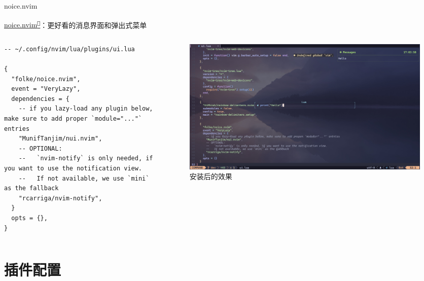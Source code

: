 \documentclass[aspectratio=169]{ctexbeamer}
\newcommand{\nerd}[1]{\texttt{#1}}
\newcommand{\link}[3][]{\href{#3}{#2\textsuperscript{\nerd{}}}}
\begin{document}
    \begin{frame}[fragile]{noice.nvim}

      \link{noice.nvim}{https://github.com/folke/noice.nvim}：更好看的消息界面和弹出式菜单 %

      \begin{columns}
        \begin{column}{0.4\linewidth}
          \begin{lstlisting}[basicstyle=\tiny\ttfamily]
-- ~/.config/nvim/lua/plugins/ui.lua

{
  "folke/noice.nvim",
  event = "VeryLazy",
  dependencies = {
    -- if you lazy-load any plugin below, make sure to add proper `module="..."` entries
    "MunifTanjim/nui.nvim",
    -- OPTIONAL:
    --   `nvim-notify` is only needed, if you want to use the notification view.
    --   If not available, we use `mini` as the fallback
    "rcarriga/nvim-notify",
  }
  opts = {},
}
          \end{lstlisting}
        \end{column}

        \begin{column}{0.6\linewidth}

          \begin{figure}[H]
            \centering
            \includegraphics[width=\linewidth]{./Figures/Noice_Finish.jpg}
            \caption{安装后的效果}%
          \end{figure}

        \end{column}
      \end{columns}

    \end{frame}

\section{插件配置}
\end{document}
